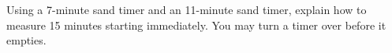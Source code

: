 Using a 7-minute sand timer and an 11-minute sand timer, explain how to measure 15 minutes starting immediately. You may turn a timer over before it empties.
